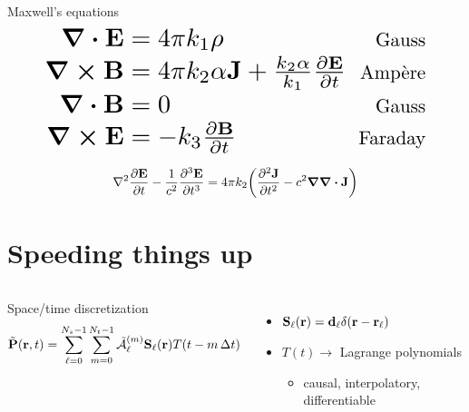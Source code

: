 \documentclass[aspectratio=169]{beamer}
\begin{document}
\begin{frame}{Maxwell's equations}
  \begin{align*}
    \scalebox{2}{$\div \vb{E}$} & \scalebox{2}{$\; = 4 \pi k_1 \rho$} &  \scalebox{1.5}{\text{Gauss}}\\
    \scalebox{2}{$\curl \vb{B}$} & \scalebox{2}{$\; = 4 \pi k_2 \alpha \vb{J} + \frac{k_2 \alpha}{k_1} \pdv{\vb{E}}{t}$} & \scalebox{1.5}{\text{Amp\`ere}} \\
    \scalebox{2}{$\div \vb{B}$} & \scalebox{2}{$\; = 0$} & \scalebox{1.5}{\text{Gauss}} \\
    \scalebox{2}{$\curl \vb{E}$} & \scalebox{2}{$\; = -k_3 \pdv{\vb{B}}{t}$} & \scalebox{1.5}{\text{Faraday}} \\
  \end{align*}
\end{frame}

\begin{frame}
  \begin{equation*}
    \laplacian{\pdv{\vb{E}}{t}} - \frac{1}{c^2} \pdv[3]{\vb{E}}{t} = 4 \pi k_2 \qty(\pdv[2]{\vb{J}}{t} - c^2 \grad \div \vb{J})
  \end{equation*}
\end{frame}

\section{Speeding things up}

\begin{frame}
  \begin{columns}[T]
      \centering
      

      \begin{block}{Space/time discretization}
        \begin{equation*}
          \tilde{\vb{P}}(\vb{r}, t) = \sum_{\ell = 0}^{N_s - 1} \sum_{m = 0}^{N_t - 1} \tilde{\mathcal{A}}_\ell^{(m)}\vb{S}_\ell(\vb{r}) T(t - m \, \Delta t)
        \end{equation*}
      \end{block}
      \begin{itemize}
        \item $\vb{S}_\ell(\vb{r}) = \vb{d}_\ell \delta(\vb{r} - \vb{r}_\ell)$
        \item $T(t) \rightarrow$ Lagrange polynomials
          \begin{itemize}
            \item causal, interpolatory, differentiable
          \end{itemize}
      \end{itemize}
  \end{columns}
\end{frame}
\end{document}
